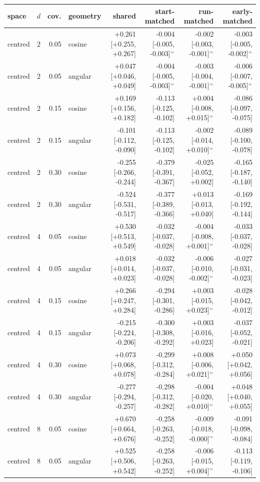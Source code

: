 \begin{tabular}{lrrlrrrr}
\toprule
space & $d$ & cov. & geometry & shared & start-matched & run-matched & early-matched \\
\midrule
centred & 2 & 0.05 & cosine & +0.261 [+0.255, +0.267] & -0.004 [-0.005, -0.003]$^{=}$ & -0.002 [-0.003, -0.001]$^{=}$ & -0.003 [-0.005, -0.002]$^{=}$ \\
centred & 2 & 0.05 & angular & +0.047 [+0.046, +0.049] & -0.004 [-0.005, -0.003]$^{=}$ & -0.003 [-0.004, -0.001]$^{=}$ & -0.006 [-0.007, -0.005]$^{=}$ \\
centred & 2 & 0.15 & cosine & +0.169 [+0.156, +0.182] & -0.113 [-0.125, -0.102] & +0.004 [-0.008, +0.015]$^{=}$ & -0.086 [-0.097, -0.075] \\
centred & 2 & 0.15 & angular & -0.101 [-0.112, -0.090] & -0.113 [-0.125, -0.102] & -0.002 [-0.014, +0.010]$^{=}$ & -0.089 [-0.100, -0.078] \\
centred & 2 & 0.30 & cosine & -0.255 [-0.266, -0.244] & -0.379 [-0.391, -0.367] & -0.025 [-0.052, +0.002] & -0.165 [-0.187, -0.140] \\
centred & 2 & 0.30 & angular & -0.524 [-0.531, -0.517] & -0.377 [-0.389, -0.366] & +0.013 [-0.013, +0.040] & -0.169 [-0.192, -0.144] \\
centred & 4 & 0.05 & cosine & +0.530 [+0.513, +0.549] & -0.032 [-0.037, -0.028] & -0.004 [-0.008, +0.001]$^{=}$ & -0.033 [-0.037, -0.028] \\
centred & 4 & 0.05 & angular & +0.018 [+0.014, +0.023] & -0.032 [-0.037, -0.028] & -0.006 [-0.010, -0.002]$^{=}$ & -0.027 [-0.031, -0.023] \\
centred & 4 & 0.15 & cosine & +0.266 [+0.247, +0.284] & -0.294 [-0.301, -0.286] & +0.003 [-0.015, +0.023]$^{=}$ & -0.028 [-0.042, -0.012] \\
centred & 4 & 0.15 & angular & -0.215 [-0.224, -0.206] & -0.300 [-0.308, -0.292] & +0.003 [-0.016, +0.023] & -0.037 [-0.052, -0.021] \\
centred & 4 & 0.30 & cosine & +0.073 [+0.068, +0.078] & -0.299 [-0.312, -0.284] & +0.008 [-0.006, +0.021]$^{=}$ & +0.050 [+0.042, +0.056] \\
centred & 4 & 0.30 & angular & -0.277 [-0.294, -0.257] & -0.298 [-0.312, -0.282] & -0.004 [-0.020, +0.010]$^{=}$ & +0.048 [+0.040, +0.055] \\
centred & 8 & 0.05 & cosine & +0.670 [+0.664, +0.676] & -0.258 [-0.263, -0.252] & -0.009 [-0.018, -0.000]$^{=}$ & -0.091 [-0.098, -0.084] \\
centred & 8 & 0.05 & angular & +0.525 [+0.506, +0.542] & -0.258 [-0.263, -0.252] & -0.006 [-0.015, +0.004]$^{=}$ & -0.113 [-0.119, -0.106] \\

\end{tabular}
